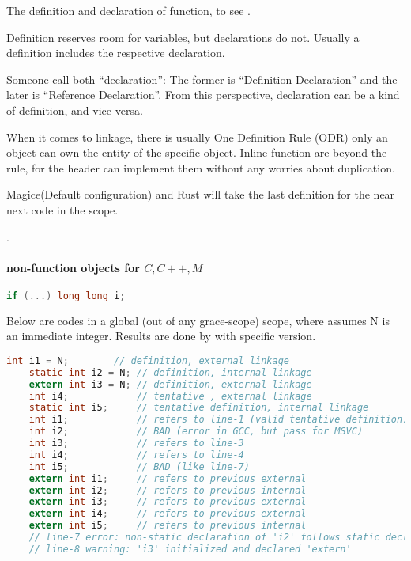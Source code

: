 
The definition and declaration of function, to see .

Definition reserves room for variables, but declarations do not.
Usually a definition includes the respective declaration.

Someone call both “declaration”: The former is “Definition Declaration” and the later is “Reference Declaration”. From this perspective, declaration can be a kind of definition, and vice versa. %

When it comes to linkage, there is usually One Definition Rule (ODR) \textemdash only an object can own the entity of the specific object. %
Inline function are beyond the rule, for the header can implement them without any worries about duplication.

Magice(Default configuration) and {Rust} will take the last definition for the near next code in the scope.

 .

\paragraph{non-function objects for $C,C++,M$}

\lstset{style=GlobalC}
\begin{lstlisting}[language=C]
	if (...) long long i;
\end{lstlisting}

Below are codes in a global (out of any grace-scope) scope, where assumes N is an immediate integer. Results are done by  with specific version.
\lstset{style=GlobalC}
\begin{lstlisting}[language=C]
	int i1 = N;        // definition, external linkage
	static int i2 = N; // definition, internal linkage
	extern int i3 = N; // definition, external linkage
	int i4;            // tentative , external linkage
	static int i5;     // tentative definition, internal linkage
	int i1;            // refers to line-1 (valid tentative definition)
	int i2;            // BAD (error in GCC, but pass for MSVC)
	int i3;            // refers to line-3
	int i4;            // refers to line-4
	int i5;            // BAD (like line-7)
	extern int i1;     // refers to previous external
	extern int i2;     // refers to previous internal
	extern int i3;     // refers to previous external
	extern int i4;     // refers to previous external
	extern int i5;     // refers to previous internal
	// line-7 error: non-static declaration of 'i2' follows static declaration
	// line-8 warning: 'i3' initialized and declared 'extern'
\end{lstlisting}

